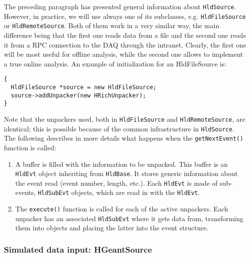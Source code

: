 The preceding paragraph has presented general information about \verb+HldSource+. However, 
in practice, we will use always one of its subclasses, e.g. \verb+HldFileSource+ or 
\verb+HldRemoteSource+. Both of them work in a very similar way, the main difference being 
that the first one reads data from a file and the second one reads it from a RPC connection 
to the DAQ through the intranet. Clearly, the first one will be most useful for offline 
analysis, while the second one allows to implement a true online analysis.
An example of initialization for an HldFileSource is:

\begin{lstlisting}
{
  HldFileSource *source = new HldFileSource;
  source->addUnpacker(new HRichUnpacker);
}
\end{lstlisting}

Note that the unpackers used, both in \verb+HldFileSource+ and \verb+HldRemoteSource+, are 
identical; this is possible because of the common infrastructure in \verb+HldSource+.
The following describes in more details what happens when the \verb+getNextEvent()+ function 
is called:

\begin{enumerate}
    \item A buffer is filled with the information to be unpacked. This buffer is an \verb+HldEvt+ 
    object inheriting from \verb+HldBase+. It stores generic information about the event read 
    (event number, length, etc.). Each \verb+HldEvt+ is made of sub-events, \verb+HldSubEvt+ 
    objects, which are read in with the \verb+HldEvt+. 
  
     \item The \verb+execute()+ function is called for each of the active unpackers. Each unpacker 
     has an associated \verb+HldSubEvt+ where it gets data from, transforming them into objects 
     and placing the latter into the event structure. 
\end{enumerate}


\subsubsection{Simulated data input: HGeantSource}

